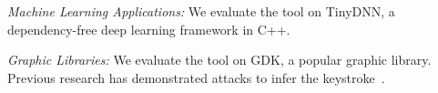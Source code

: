\textit{Machine Learning Applications:} We evaluate the tool on TinyDNN, a dependency-free deep learning framework in C++.

\textit{Graphic Libraries:} We evaluate the tool on GDK, a popular graphic library. Previous research has demonstrated attacks to infer the keystroke~\cite{191010,wang2019unveiling}.



\begin{table}
\footnotesize
\caption{Evaluation results overview: Name of the benchmark, size of the Input Data, number of leaked functions, maximum Leakage, size of the benchmark, and performance.}\label{chapter5:table:over_result}
\centering
{}
\end{table}
